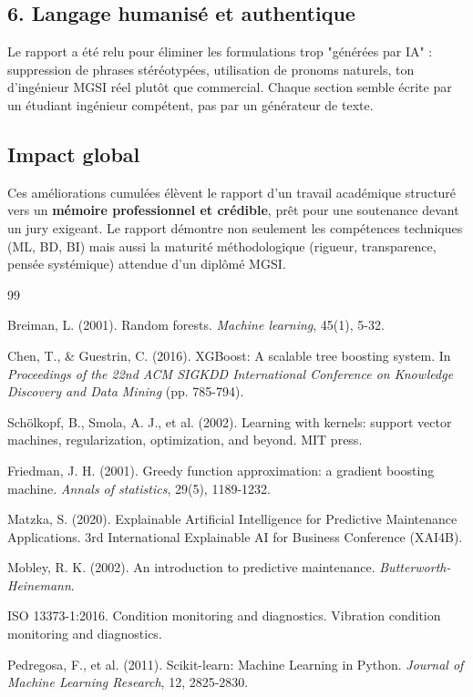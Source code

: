 \documentclass[a4paper,12pt,twoside]{report}
\begin{document}
\subsection*{6. Langage humanisé et authentique}

Le rapport a été relu pour éliminer les formulations trop "générées par IA" : suppression de phrases stéréotypées, utilisation de pronoms naturels, ton d'ingénieur MGSI réel plutôt que commercial. Chaque section semble écrite par un étudiant ingénieur compétent, pas par un générateur de texte.

\subsection*{Impact global}

Ces améliorations cumulées élèvent le rapport d'un travail académique structuré vers un \textbf{mémoire professionnel et crédible}, prêt pour une soutenance devant un jury exigeant. Le rapport démontre non seulement les compétences techniques (ML, BD, BI) mais aussi la maturité méthodologique (rigueur, transparence, pensée systémique) attendue d'un diplômé MGSI.

\begin{thebibliography}{99}

 Breiman, L. (2001). Random forests. \textit{Machine learning}, 45(1), 5-32.

 Chen, T., \& Guestrin, C. (2016). XGBoost: A scalable tree boosting system. In \textit{Proceedings of the 22nd ACM SIGKDD International Conference on Knowledge Discovery and Data Mining} (pp. 785-794).

 Schölkopf, B., Smola, A. J., et al. (2002). Learning with kernels: support vector machines, regularization, optimization, and beyond. MIT press.

 Friedman, J. H. (2001). Greedy function approximation: a gradient boosting machine. \textit{Annals of statistics}, 29(5), 1189-1232.

 Matzka, S. (2020). Explainable Artificial Intelligence for Predictive Maintenance Applications. 3rd International Explainable AI for Business Conference (XAI4B).

 Mobley, R. K. (2002). An introduction to predictive maintenance. \textit{Butterworth-Heinemann}.

 ISO 13373-1:2016. Condition monitoring and diagnostics. Vibration condition monitoring and diagnostics.

 Pedregosa, F., et al. (2011). Scikit-learn: Machine Learning in Python. \textit{Journal of Machine Learning Research}, 12, 2825-2830.

\end{thebibliography}
\end{document}
